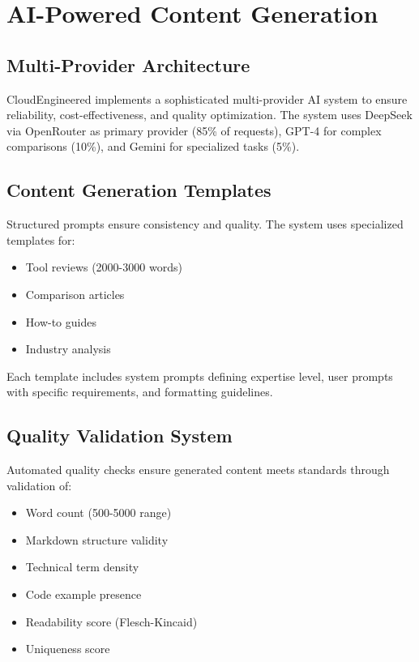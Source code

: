 \documentclass[conference]{IEEEtran}
\begin{document}
\section{AI-Powered Content Generation}

\subsection{Multi-Provider Architecture}

CloudEngineered implements a sophisticated multi-provider AI system to ensure reliability, cost-effectiveness, and quality optimization. The system uses DeepSeek via OpenRouter as primary provider (85\% of requests), GPT-4 for complex comparisons (10\%), and Gemini for specialized tasks (5\%).

\subsection{Content Generation Templates}

Structured prompts ensure consistency and quality. The system uses specialized templates for:
\begin{itemize}
    \item Tool reviews (2000-3000 words)
    \item Comparison articles
    \item How-to guides
    \item Industry analysis
\end{itemize}

Each template includes system prompts defining expertise level, user prompts with specific requirements, and formatting guidelines.

\subsection{Quality Validation System}

Automated quality checks ensure generated content meets standards through validation of:
\begin{itemize}
    \item Word count (500-5000 range)
    \item Markdown structure validity
    \item Technical term density
    \item Code example presence
    \item Readability score (Flesch-Kincaid)
    \item Uniqueness score
\end{itemize}
\end{document}
